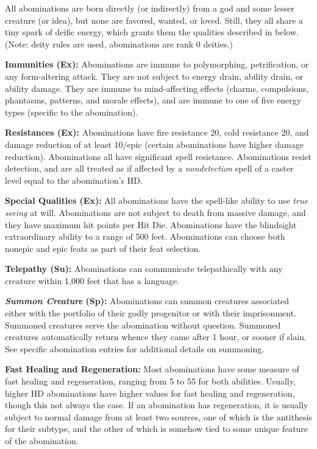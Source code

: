 \documentclass{article}
\begin{document}
All abominations are born directly (or indirectly) from a god and some lesser creature 
(or idea), but none are favored, wanted, or loved. Still, they all share a tiny 
spark of deific energy, which grants them the qualities described in below. (Note: 
deity rules are used\textit{, }abominations are rank 0 deities.) 

\textbf{Immunities (Ex):} Abominations are immune to polymorphing, petrification, 
or any form-altering attack. They are not subject to energy drain, ability drain, 
or ability damage. They are immune to mind-affecting effects (charms, compulsions, 
phantasms, patterns, and morale effects), and are immune to one of five energy 
types (specific to the abomination). 

\textbf{Resistances (Ex):} Abominations have fire resistance 20, cold resistance 
20, and damage reduction of at least 10/epic (certain abominations have higher 
damage reduction). Abominations all have significant spell resistance. Abominations 
resist detection, and are all treated as if affected by a \textit{nondetection 
}spell of a caster level equal to the abomination's HD. 

\textbf{Special Qualities (Ex):} All abominations have the spell-like ability to 
use \textit{true seeing }at will. Abominations are not subject to death from massive 
damage, and they have maximum hit points per Hit Die. Abominations have the blindsight 
extraordinary ability to a range of 500 feet. Abominations can choose both nonepic 
and epic feats as part of their feat selection. 

\textbf{Telepathy (Su):} Abominations can communicate telepathically with any creature 
within 1,000 feet that has a language. 

\textit{\textbf{Summon Creature }}\textbf{(Sp):} Abominations can summon creatures 
associated either with the portfolio of their godly progenitor or with their imprisonment. 
Summoned creatures serve the abomination without question. Summoned creatures automatically 
return whence they came after 1 hour, or sooner if slain. See specific abomination 
entries for additional details on summoning. 

\textbf{Fast Healing and Regeneration: }Most abominations have some measure of 
fast healing and regeneration, ranging from 5 to 55 for both abilities. Usually, 
higher HD abominations have higher values for fast healing and regeneration, though 
this not always the case. If an abomination has regeneration, it is usually subject 
to normal damage from at least two sources, one of which is the antithesis for 
their subtype, and the other of which is somehow tied to some unique feature of 
the abomination. 
\end{document}
